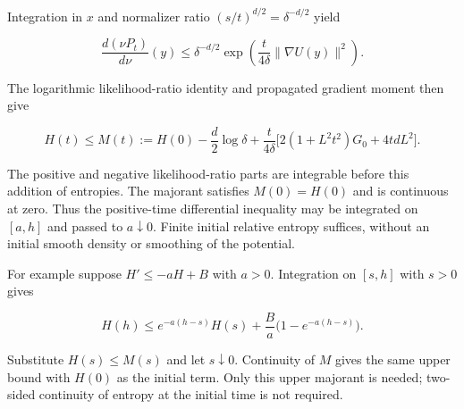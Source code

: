 \documentclass[11pt,a4paper]{report}
\begin{document}
Integration in \(x\) and normalizer ratio \((s/t)^{d/2}=\delta^{-d/2}\) yield

\[\frac{d(\nu P_t)}{d\nu}(y)\le\delta^{-d/2}
\exp\!\left(\frac t{4\delta}\|\nabla U(y)\|^2\right).\]

The logarithmic likelihood-ratio identity and propagated gradient moment then give

\[H(t)\le M(t):=H(0)-\frac d2\log\delta
+\frac t{4\delta}\bigl[2(1+L^2t^2)G_0+4tdL^2\bigr].\]

The positive and negative likelihood-ratio parts are integrable before this addition of entropies. The majorant satisfies \(M(0)=H(0)\) and is continuous at zero. Thus the positive-time differential inequality may be integrated on \([a,h]\) and passed to \(a\downarrow0\). Finite initial relative entropy suffices, without an initial smooth density or smoothing of the potential.



For example suppose \(H'\le-aH+B\) with \(a>0\). Integration on \([s,h]\) with \(s>0\) gives

\[H(h)\le e^{-a(h-s)}H(s)+\frac Ba\bigl(1-e^{-a(h-s)}\bigr).\]

Substitute \(H(s)\le M(s)\) and let \(s\downarrow0\). Continuity of \(M\) gives the same upper bound with \(H(0)\) as the initial term. Only this upper majorant is needed; two-sided continuity of entropy at the initial time is not required.
\end{document}
